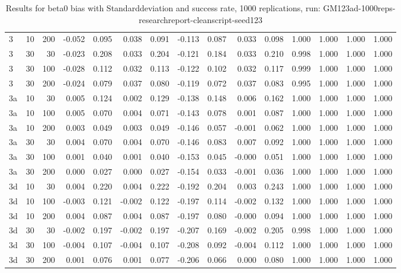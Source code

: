 \begin{table}[ht]
\begin{tabular}{lrrrrrrrrrrrrrr}
  3 & 10 & 200 & -0.052 & 0.095 & 0.038 & 0.091 & -0.113 & 0.087 & 0.033 & 0.098 & 1.000 & 1.000 & 1.000 & 1.000 \\ 
  3 & 30 & 30 & -0.023 & 0.208 & 0.033 & 0.204 & -0.121 & 0.184 & 0.033 & 0.210 & 0.998 & 1.000 & 1.000 & 1.000 \\ 
  3 & 30 & 100 & -0.028 & 0.112 & 0.032 & 0.113 & -0.122 & 0.102 & 0.032 & 0.117 & 0.999 & 1.000 & 1.000 & 1.000 \\ 
  3 & 30 & 200 & -0.024 & 0.079 & 0.037 & 0.080 & -0.119 & 0.072 & 0.037 & 0.083 & 0.995 & 1.000 & 1.000 & 1.000 \\ 
  3a & 10 & 30 & 0.005 & 0.124 & 0.002 & 0.129 & -0.138 & 0.148 & 0.006 & 0.162 & 1.000 & 1.000 & 1.000 & 1.000 \\ 
  3a & 10 & 100 & 0.005 & 0.070 & 0.004 & 0.071 & -0.143 & 0.078 & 0.001 & 0.087 & 1.000 & 1.000 & 1.000 & 1.000 \\ 
  3a & 10 & 200 & 0.003 & 0.049 & 0.003 & 0.049 & -0.146 & 0.057 & -0.001 & 0.062 & 1.000 & 1.000 & 1.000 & 1.000 \\ 
  3a & 30 & 30 & 0.004 & 0.070 & 0.004 & 0.070 & -0.146 & 0.083 & 0.007 & 0.092 & 1.000 & 1.000 & 1.000 & 1.000 \\ 
  3a & 30 & 100 & 0.001 & 0.040 & 0.001 & 0.040 & -0.153 & 0.045 & -0.000 & 0.051 & 1.000 & 1.000 & 1.000 & 1.000 \\ 
  3a & 30 & 200 & 0.000 & 0.027 & 0.000 & 0.027 & -0.154 & 0.033 & -0.001 & 0.036 & 1.000 & 1.000 & 1.000 & 1.000 \\ 
  3d & 10 & 30 & 0.004 & 0.220 & 0.004 & 0.222 & -0.192 & 0.204 & 0.003 & 0.243 & 1.000 & 1.000 & 1.000 & 1.000 \\ 
  3d & 10 & 100 & -0.003 & 0.121 & -0.002 & 0.122 & -0.197 & 0.114 & -0.002 & 0.132 & 1.000 & 1.000 & 1.000 & 1.000 \\ 
  3d & 10 & 200 & 0.004 & 0.087 & 0.004 & 0.087 & -0.197 & 0.080 & -0.000 & 0.094 & 1.000 & 1.000 & 1.000 & 1.000 \\ 
  3d & 30 & 30 & -0.002 & 0.197 & -0.002 & 0.197 & -0.207 & 0.169 & -0.002 & 0.205 & 0.998 & 1.000 & 1.000 & 1.000 \\ 
  3d & 30 & 100 & -0.004 & 0.107 & -0.004 & 0.107 & -0.208 & 0.092 & -0.004 & 0.112 & 1.000 & 1.000 & 1.000 & 1.000 \\ 
  3d & 30 & 200 & 0.001 & 0.076 & 0.001 & 0.077 & -0.206 & 0.066 & 0.000 & 0.080 & 1.000 & 1.000 & 1.000 & 1.000 \\ 
   \hline
\end{tabular}
\caption{Results for beta0 bias with Standarddeviation and success rate, 1000 replications, run: GM123ad-1000reps-researchreport-cleanscript-seed123} 
\label{tab:beta0_bias_sd_success}
\end{table}
